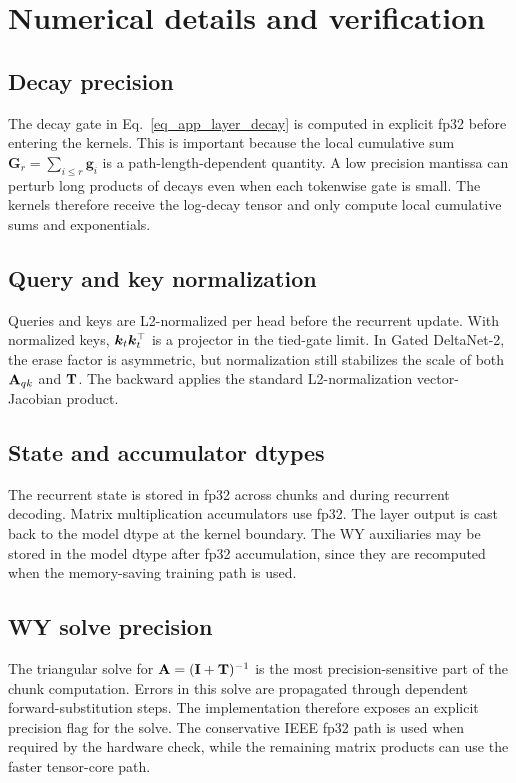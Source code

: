 \section{Numerical details and verification}
\label{app_numerics}

\subsection{Decay precision}
\label{app_decay_precision}

The decay gate in Eq.~\ref{eq_app_layer_decay} is computed in explicit fp32 before entering the kernels. This is important because the local cumulative sum $\boldsymbol{G}_r=\sum_{i\le r}\boldsymbol{g}_i$ is a path-length-dependent quantity. A low precision mantissa can perturb long products of decays even when each tokenwise gate is small. The kernels therefore receive the log-decay tensor and only compute local cumulative sums and exponentials.

\subsection{Query and key normalization}
\label{app_qk_norm}

Queries and keys are L2-normalized per head before the recurrent update. With normalized keys, ${\bm{k}}_t{\bm{k}}_t^\top$ is a projector in the tied-gate limit. In Gated DeltaNet-2, the erase factor is asymmetric, but normalization still stabilizes the scale of both ${\mathbf{A}}_{qk}$ and ${\mathbf{T}}$. The backward applies the standard L2-normalization vector-Jacobian product.

\subsection{State and accumulator dtypes}
\label{app_dtype}

The recurrent state is stored in fp32 across chunks and during recurrent decoding. Matrix multiplication accumulators use fp32. The layer output is cast back to the model dtype at the kernel boundary. The WY auxiliaries may be stored in the model dtype after fp32 accumulation, since they are recomputed when the memory-saving training path is used.

\subsection{WY solve precision}
\label{app_solve_precision}

The triangular solve for ${\mathbf{A}}=({\mathbf{I}}+{\mathbf{T}})^{-1}$ is the most precision-sensitive part of the chunk computation. Errors in this solve are propagated through dependent forward-substitution steps. The implementation therefore exposes an explicit precision flag for the solve. The conservative IEEE fp32 path is used when required by the hardware check, while the remaining matrix products can use the faster tensor-core path.


